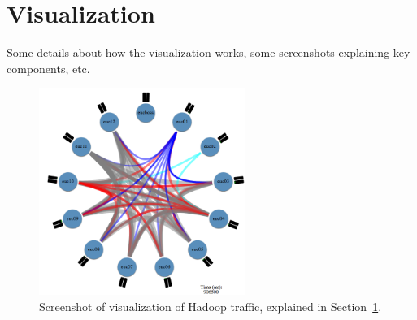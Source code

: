 \section{Visualization}
\label{sec:viz}

Some details about how the visualization works, 
some screenshots explaining key components, etc.

\begin{figure}
\centering
\includegraphics[width=0.6\textwidth]{figures/hadoop-viz.png}
\caption{Screenshot of visualization of Hadoop traffic, explained in Section~\ref{sec:viz}.}
\label{fig:xtrace}
\end{figure}
